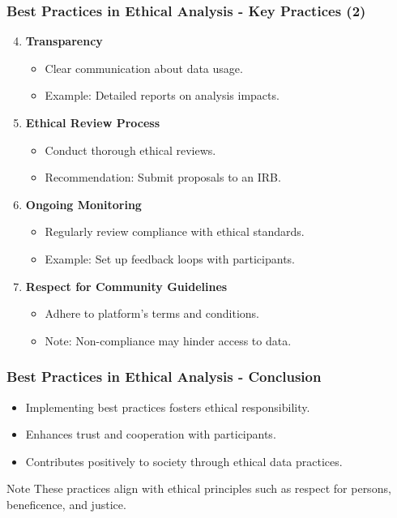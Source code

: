 \documentclass{beamer}
\begin{document}
\begin{frame}[fragile]
    \frametitle{Best Practices in Ethical Analysis - Key Practices (2)}
    \begin{enumerate}
        \setcounter{enumi}{3} %
        \item \textbf{Transparency}
            \begin{itemize}
                \item Clear communication about data usage.
                \item Example: Detailed reports on analysis impacts.
            \end{itemize}

        \item \textbf{Ethical Review Process}
            \begin{itemize}
                \item Conduct thorough ethical reviews.
                \item Recommendation: Submit proposals to an IRB.
            \end{itemize}

        \item \textbf{Ongoing Monitoring}
            \begin{itemize}
                \item Regularly review compliance with ethical standards.
                \item Example: Set up feedback loops with participants.
            \end{itemize}

        \item \textbf{Respect for Community Guidelines}
            \begin{itemize}
                \item Adhere to platform's terms and conditions.
                \item Note: Non-compliance may hinder access to data.
            \end{itemize}
    \end{enumerate}
\end{frame}

\begin{frame}[fragile]
    \frametitle{Best Practices in Ethical Analysis - Conclusion}
    \begin{itemize}
        \item Implementing best practices fosters ethical responsibility.
        \item Enhances trust and cooperation with participants.
        \item Contributes positively to society through ethical data practices.
    \end{itemize}

    \begin{block}{Note}
        These practices align with ethical principles such as respect for persons, beneficence, and justice.
    \end{block}
\end{frame}
\end{document}
